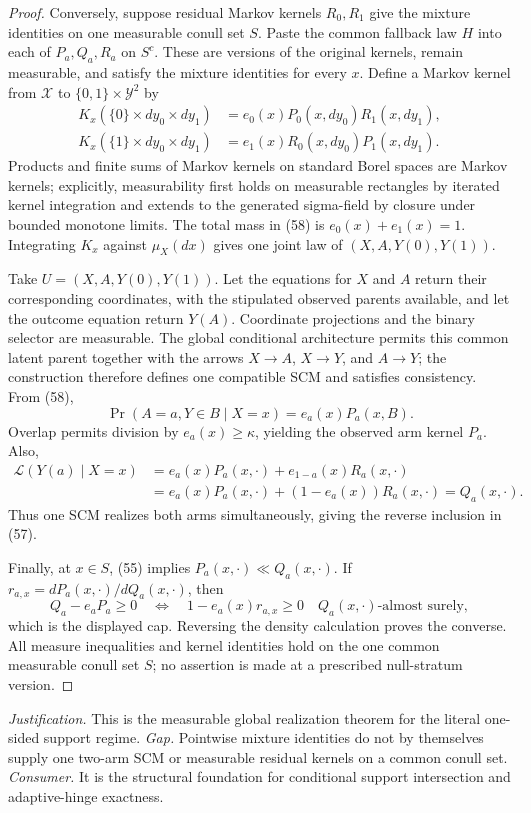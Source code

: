 \documentclass{article}
\begin{document}
\begin{proof}
Conversely, suppose residual Markov kernels \(R_0,R_1\) give the mixture identities on one measurable conull set \(S\).  Paste the common fallback law \(H\) into each of \(P_a,Q_a,R_a\) on \(S^c\).  These are versions of the original kernels, remain measurable, and satisfy the mixture identities for every \(x\).  Define a Markov kernel from \(\mathcal X\) to \(\{0,1\}\times\mathcal Y^2\) by
\[
 \begin{aligned}
 K_x(\{0\}\times dy_0\times dy_1)
 &=e_0(x)P_0(x,dy_0)R_1(x,dy_1),\\
 K_x(\{1\}\times dy_0\times dy_1)
 &=e_1(x)R_0(x,dy_0)P_1(x,dy_1).
 \end{aligned} \tag{58}
\]
Products and finite sums of Markov kernels on standard Borel spaces are Markov kernels; explicitly, measurability first holds on measurable rectangles by iterated kernel integration and extends to the generated sigma-field by closure under bounded monotone limits.  The total mass in (58) is \(e_0(x)+e_1(x)=1\).  Integrating \(K_x\) against \(\mu_X(dx)\) gives one joint law of \((X,A,Y(0),Y(1))\).

Take \(U=(X,A,Y(0),Y(1))\).  Let the equations for \(X\) and \(A\) return their corresponding coordinates, with the stipulated observed parents available, and let the outcome equation return \(Y(A)\).  Coordinate projections and the binary selector are measurable.  The global conditional architecture permits this common latent parent together with the arrows \(X\to A\), \(X\to Y\), and \(A\to Y\); the construction therefore defines one compatible SCM and satisfies consistency.  From (58),
\[
 \Pr(A=a,Y\in B\mid X=x)=e_a(x)P_a(x,B).
\]
Overlap permits division by \(e_a(x)\ge\kappa\), yielding the observed arm kernel \(P_a\).  Also,
\[
 \begin{aligned}
 \mathcal L(Y(a)\mid X=x)
 &=e_a(x)P_a(x,\cdot)+e_{1-a}(x)R_a(x,\cdot)\\
 &=e_a(x)P_a(x,\cdot)+(1-e_a(x))R_a(x,\cdot)
 =Q_a(x,\cdot).
 \end{aligned} \tag{59}
\]
Thus one SCM realizes both arms simultaneously, giving the reverse inclusion in (57).

Finally, at \(x\in S\), (55) implies \(P_a(x,\cdot)\ll Q_a(x,\cdot)\).  If \(r_{a,x}=dP_a(x,\cdot)/dQ_a(x,\cdot)\), then
\[
 Q_a-e_aP_a\ge0
 \quad\Longleftrightarrow\quad
 1-e_a(x)r_{a,x}\ge0\quad Q_a(x,\cdot)\text{-almost surely},
\]
which is the displayed cap.  Reversing the density calculation proves the converse.  All measure inequalities and kernel identities hold on the one common measurable conull set \(S\); no assertion is made at a prescribed null-stratum version.
\end{proof}
\par\smallskip\noindent \textit{Justification.} This is the measurable global realization theorem for the literal one-sided support regime. \textit{Gap.} Pointwise mixture identities do not by themselves supply one two-arm SCM or measurable residual kernels on a common conull set. \textit{Consumer.} It is the structural foundation for conditional support intersection and adaptive-hinge exactness.
\end{document}
